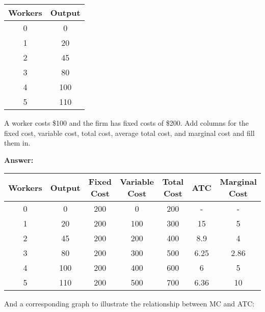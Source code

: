 \documentclass[12pt]{article}
\begin{document}
\begin{table}[H]
        \centering
        \begin{tabular}{cc}
            Workers & Output \\
            \hline
            0 & 0 \\
            1 & 20 \\
            2 & 45 \\
            3 & 80 \\
            4 & 100 \\
            5 & 110 \\
        \end{tabular}

        \label{tab:placeholder}
    \end{table}
    
     A worker costs \$100 and the firm has fixed costs of \$200. Add columns for the fixed cost, variable cost, total cost, average total cost, and marginal cost and fill them in.
    
\textbf{Answer:
}
\begin{table}[H]
        \centering
        \begin{tabular}{ccccccc}
            Workers & Output & Fixed Cost & Variable Cost & Total Cost & ATC & Marginal Cost \\
            \hline
            0 & 0 & 200 & 0 & 200 & - & -\\
            1 & 20 & 200 & 100 & 300 & 15 & 5 \\
            2 & 45 & 200 & 200 & 400 & 8.9 & 4\\
            3 & 80 & 200 & 300 & 500 & 6.25 & 2.86\\
            4 & 100 & 200 & 400 & 600 & 6 & 5\\
            5 & 110 & 200 & 500 & 700 & 6.36 & 10\\
        \end{tabular}

        \label{tab:placeholder}
    \end{table}

    And a corresponding graph to illustrate the relationship between MC and ATC:

\end{document}
